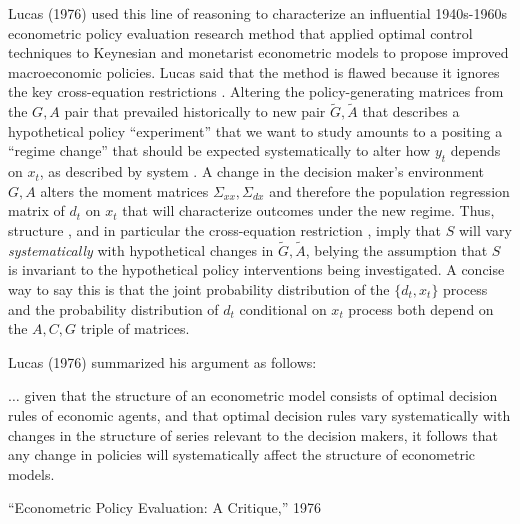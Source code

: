 Lucas (1976) used this  line of reasoning to  characterize an influential  1940s-1960s econometric policy evaluation
research method that  applied optimal control techniques to Keynesian and monetarist
econometric models to propose  improved  macroeconomic policies.
Lucas said that the method is flawed because it  ignores the key cross-equation restrictions . Altering the policy-generating
matrices from the $G, A$ pair that prevailed historically to new pair  $\tilde G, \tilde A$ that describes a  hypothetical policy ``experiment'' that we want to study
  amounts to a  positing a  ``regime change'' that
 should be expected  systematically to alter how $y_t$ depends on $x_t$, as
 described by
 system .  %
 A
 change in the decision maker's  environment $G, A$   alters the moment matrices
$ \Sigma_{xx}, \Sigma_{dx}$ and therefore the population regression matrix of $d_t$ on $x_t$ that will characterize outcomes
under the new  regime. Thus,  structure , and in particular the cross-equation restriction ,
imply that $S$ will vary {\it systematically\/} with  hypothetical changes
in  $\tilde G, \tilde A$, belying the assumption that $S$ is invariant to the hypothetical policy interventions being investigated.
A concise way to say this is that the joint probability distribution of the $\{d_t, x_t\}$ process and the  probability distribution
of $d_t$ conditional on  $x_t$ process both  depend on the $A, C, G$ triple of matrices.

Lucas (1976) summarized his argument as follows:

\epigraph{$\ldots$ given that the structure of an econometric model consists of optimal decision rules of economic agents, and
that optimal decision rules vary systematically with changes in the structure of series relevant to the decision makers, it follows
that any change in policies will systematically affect the structure of econometric models.}{``Econometric Policy Evaluation: A Critique,'' 1976}


